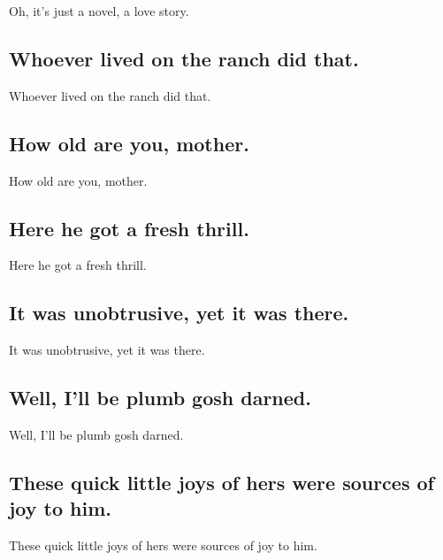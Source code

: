 \documentclass[]{article}
\begin{document}
Oh, it's just a novel, a love story.

\hypertarget{whoever-lived-on-the-ranch-did-that.}{%
\subsection{Whoever lived on the ranch did
that.}\label{whoever-lived-on-the-ranch-did-that.}}

Whoever lived on the ranch did that.

\hypertarget{how-old-are-you-mother.}{%
\subsection{How old are you, mother.}\label{how-old-are-you-mother.}}

How old are you, mother.

\hypertarget{here-he-got-a-fresh-thrill.}{%
\subsection{Here he got a fresh
thrill.}\label{here-he-got-a-fresh-thrill.}}

Here he got a fresh thrill.

\hypertarget{it-was-unobtrusive-yet-it-was-there.}{%
\subsection{It was unobtrusive, yet it was
there.}\label{it-was-unobtrusive-yet-it-was-there.}}

It was unobtrusive, yet it was there.

\hypertarget{well-ill-be-plumb-gosh-darned.}{%
\subsection{Well, I'll be plumb gosh
darned.}\label{well-ill-be-plumb-gosh-darned.}}

Well, I'll be plumb gosh darned.

\hypertarget{these-quick-little-joys-of-hers-were-sources-of-joy-to-him.}{%
\subsection{These quick little joys of hers were sources of joy to
him.}\label{these-quick-little-joys-of-hers-were-sources-of-joy-to-him.}}

These quick little joys of hers were sources of joy to him.
\end{document}
